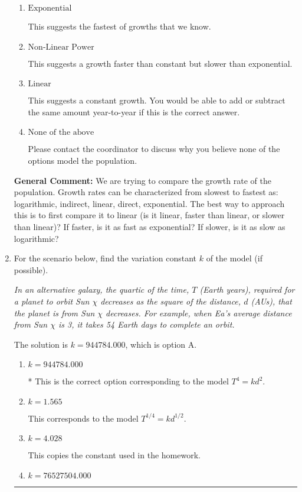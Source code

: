 \documentclass{extbook}[14pt]
\newcommand{\litem}[1]{\item #1

\rule{\textwidth}{0.4pt}}
\begin{document}
\begin{enumerate}
{\begin{enumerate}[label=\Alph*.]
This suggests the slowest of growths that we know.
\item \( \text{Exponential} \)

This suggests the fastest of growths that we know.
\item \( \text{Non-Linear Power} \)

This suggests a growth faster than constant but slower than exponential.
\item \( \text{Linear} \)

This suggests a constant growth. You would be able to add or subtract the same amount year-to-year if this is the correct answer.
\item \( \text{None of the above} \)

Please contact the coordinator to discuss why you believe none of the options model the population.
\end{enumerate}

\textbf{General Comment:} We are trying to compare the growth rate of the population. Growth rates can be characterized from slowest to fastest as: logarithmic, indirect, linear, direct, exponential. The best way to approach this is to first compare it to linear (is it linear, faster than linear, or slower than linear)? If faster, is it as fast as exponential? If slower, is it as slow as logarithmic?
}
\litem{
For the scenario below, find the variation constant $k$ of the model (if possible).

\begin{center}
    \textit{ In an alternative galaxy, the quartic of the time, $T$ (Earth years), required for a planet to orbit Sun $\chi$ decreases as the square of the distance, $d$ (AUs), that the planet is from Sun $\chi$ decreases. For example, when Ea's average distance from Sun $\chi$ is 3, it takes 54 Earth days to complete an orbit. }
\end{center}


The solution is \( k = 944784.000 \), which is option A.\begin{enumerate}[label=\Alph*.]
\item \( k = 944784.000 \)

* This is the correct option corresponding to the model $T^{4} = k d^{2}$.
\item \( k = 1.565 \)

This corresponds to the model $T^{1/4} = k d^{1/2}$.
\item \( k = 4.028 \)

This copies the constant used in the homework.
\item \( k = 76527504.000 \)


\end{enumerate}}
\end{enumerate}
\end{document}
